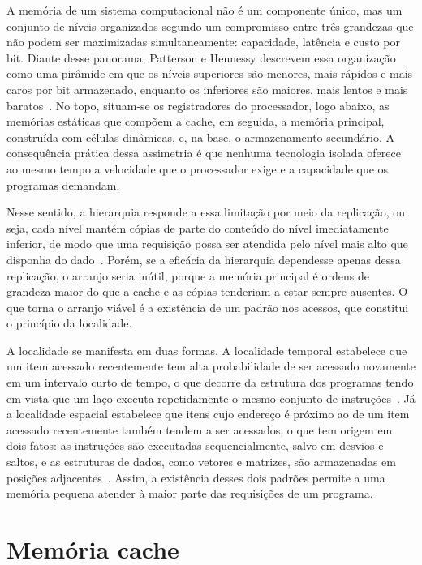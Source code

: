 A memória de um sistema computacional não é um componente único, mas um conjunto de níveis organizados segundo um compromisso entre três grandezas que não podem ser maximizadas simultaneamente: capacidade, latência e custo por bit. Diante desse panorama, Patterson e Hennessy descrevem essa organização como uma pirâmide em que os níveis superiores são menores, mais rápidos e mais caros por bit armazenado, enquanto os inferiores são maiores, mais lentos e mais baratos~\cite{patterson2020computer}. No topo, situam-se os registradores do processador, logo abaixo, as memórias estáticas que compõem a cache, em seguida, a memória principal, construída com células dinâmicas, e, na base, o armazenamento secundário. A consequência prática dessa assimetria é que nenhuma tecnologia isolada oferece ao mesmo tempo a velocidade que o processador exige e a capacidade que os programas demandam.

Nesse sentido, a hierarquia responde a essa limitação por meio da replicação, ou seja, cada nível mantém cópias de parte do conteúdo do nível imediatamente inferior, de modo que uma requisição possa ser atendida pelo nível mais alto que disponha do dado~\cite{patterson2020computer}. Porém, se a eficácia da hierarquia dependesse apenas dessa replicação, o arranjo seria inútil, porque a memória principal é ordens de grandeza maior do que a cache e as cópias tenderiam a estar sempre ausentes. O que torna o arranjo viável é a existência de um padrão nos acessos, que constitui o princípio da localidade.

A localidade se manifesta em duas formas. A localidade temporal estabelece que um item acessado recentemente tem alta probabilidade de ser acessado novamente em um intervalo curto de tempo, o que decorre da estrutura dos programas tendo em vista que um laço executa repetidamente o mesmo conjunto de instruções~\cite{patterson2020computer}. Já a localidade espacial estabelece que itens cujo endereço é próximo ao de um item acessado recentemente também tendem a ser acessados, o que tem origem em dois fatos: as instruções são executadas sequencialmente, salvo em desvios e saltos, e as estruturas de dados, como vetores e matrizes, são armazenadas em posições adjacentes~\cite{patterson2020computer}. Assim, a existência desses dois padrões permite a uma memória pequena atender à maior parte das requisições de um programa.

\section{Memória cache}\label{sec:2.5}

